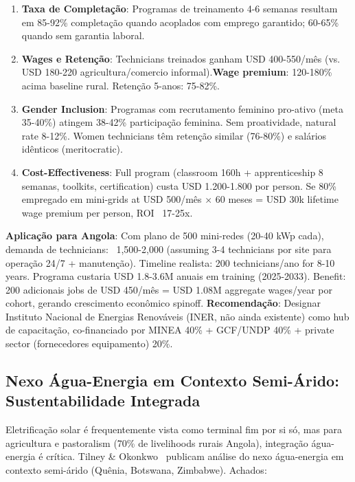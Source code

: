 \documentclass[12pt, a4paper]{article}
\begin{document}
\begin{enumerate}
\item\textbf{Taxa de Completação}: Programas de treinamento 4-6 semanas resultam em 85-92\% completação quando acoplados com emprego garantido; 60-65\% quando sem garantia laboral.
\item\textbf{Wages e Retenção}: Technicians treinados ganham USD 400-550/mês (vs. USD 180-220 agricultura/comercio informal).\textbf{Wage premium}: 120-180\% acima baseline rural. Retenção 5-anos: 75-82\%.
\item\textbf{Gender Inclusion}: Programas com recrutamento feminino pro-ativo (meta 35-40\%) atingem 38-42\% participação feminina. Sem proatividade, natural rate 8-12\%. Women technicians têm retenção similar (76-80\%) e salários idênticos (meritocratic).
\item\textbf{Cost-Effectiveness}: Full program (classroom 160h + apprenticeship 8 semanas, toolkits, certification) custa USD 1.200-1.800 por person. Se 80\% empregado em mini-grids at USD 500/mês × 60 meses = USD 30k lifetime wage premium per person, ROI ~17-25x.
\end{enumerate}
\textbf{Aplicação para Angola}: Com plano de 500 mini-redes (20-40 kWp cada), demanda de technicians: ~1,500-2,000 (assuming 3-4 technicians por site para operação 24/7 + manutenção). Timeline realista: 200 technicians/ano for 8-10 years. Programa custaria USD 1.8-3.6M anuais em training (2025-2033). Benefit: 200 adicionais jobs de USD 450/mês = USD 1.08M aggregate wages/year por cohort, gerando crescimento econômico spinoff.
\textbf{Recomendação}: Designar Instituto Nacional de Energias Renováveis (INER, não ainda existente) como hub de capacitação, co-financiado por MINEA 40\% + GCF/UNDP 40\% + private sector (fornecedores equipamento) 20\%.

\subsection{Nexo Água-Energia em Contexto Semi-Árido: Sustentabilidade Integrada}

Eletrificação solar é frequentemente vista como terminal fim por si só, mas para agricultura e pastoralism (70\% de livelihoods rurais Angola), integração água-energia é crítica. Tilney \& Okonkwo~\citep{Tilney2024} publicam análise do nexo água-energia em contexto semi-árido (Quênia, Botswana, Zimbabwe). Achados:
\end{document}
